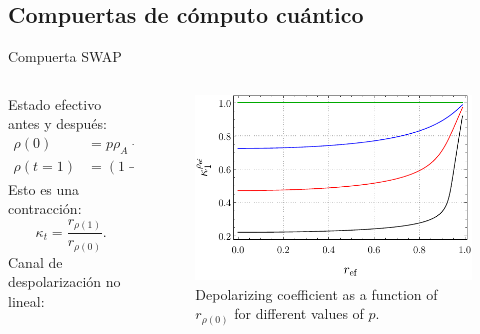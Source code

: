 \subsection{Compuertas de cómputo cuántico}
\begin{frame}{Compuerta SWAP}
    \begin{columns}
        \begin{column}{0.5\textwidth}
            Estado efectivo antes y después:
            \begin{align*}
                \rho(0)&=p\rho_{A}+(1-p)\rho_{B},\\
                \rho(t=1)&=(1-p)\rho_{A}+p\rho_{B}.
                \end{align*}\pause
                Esto es una contracción:
                \begin{equation*}
                    \kappa_{t}=\frac{r_{\rho(1)}}{r_{\rho(0)}}.
                  \end{equation*}\pause
                  Canal de despolarización no lineal:\pause
                  \begin{center}
                  \end{center}
        \end{column}\pause
        \begin{column}{0.5\textwidth}
            \begin{figure}[h!]
                \centering
                \includegraphics[width=0.9\linewidth]{figures/maxent_results/K(r).pdf}
                \caption{Depolarizing coefficient as a function of $r_{\rho(0)}$ for different values of $p$.}
              \end{figure}
        \end{column}
    \end{columns}
\end{frame}
